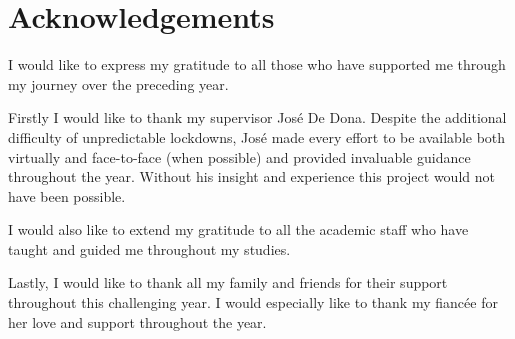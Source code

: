 
\chapter*{Acknowledgements}\label{Acknowledgements}

I would like to express my gratitude to all those who have supported me through my journey over the preceding year.

Firstly I would like to thank my supervisor Jos\'e De Dona. Despite the additional difficulty of unpredictable lockdowns, Jos\'e made every effort to be available both virtually and face-to-face (when possible) and provided invaluable guidance throughout the year. Without his insight and experience this project would not have been possible.

I would also like to extend my gratitude to all the academic staff who have taught and guided me throughout my studies.

Lastly, I would like to thank all my family and friends for their support throughout this challenging year. I would especially like to thank my fianc\'ee for her love and support throughout the year. 


\clearpage

